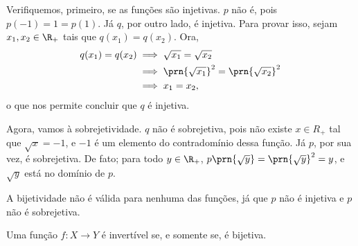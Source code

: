 \begin{solution}
    Verifiquemos, primeiro, se as funções são injetivas. $p$ não é, pois $p(-1)=1=p(1)$.
    Já $q$, por outro lado, é injetiva.
    Para provar isso, sejam $x_1, x_2 \in \R_+$ tais que $q(x_1)=q(x_2)$.
    Ora, 
    \begin{align*}
        q(x_1) = q(x_2) & \implies \sqrt{x_1} = \sqrt{x_2} \\ & \implies \prn{\sqrt{x_1}}^2 = \prn{\sqrt{x_2}}^2 \\ & \implies x_1 = x_2,
    \end{align*}
    o que nos permite concluir que $q$ é injetiva.

    Agora, vamos à sobrejetividade.
    $q$ não é sobrejetiva, pois não existe $x \in R_+$ tal que $\sqrt x = -1$, e $-1$ é um elemento do contradomínio dessa função.
    Já $p$, por sua vez, é sobrejetiva. 
    De fato; para todo $y \in \R_+$, $p\prn{\sqrt y} = \prn{\sqrt y}^2 = y$, e $\sqrt y$ está no domínio de $p$.

    A bijetividade não é válida para nenhuma das funções, já que $p$ não é injetiva e $p$ não é sobrejetiva.
\end{solution}

\begin{theorem}
\label{theo:inv-sse-bij}
    Uma função $f: X \to Y$ é invertível se, e somente se, é bijetiva.
\end{theorem}

